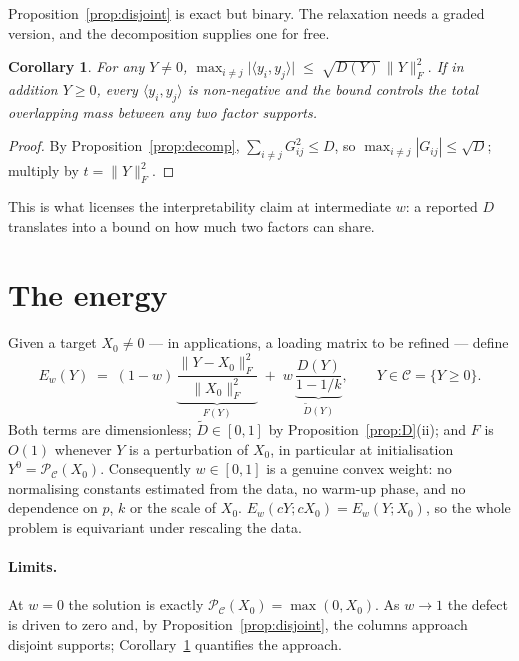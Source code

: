 \documentclass[11pt]{article}
\newtheorem{corollary}[proposition]{Corollary}
\theoremstyle{definition}
\newcommand{\Fnorm}[1]{\lVert #1 \rVert_F}
\newcommand{\ip}[2]{\langle #1, #2 \rangle}
\begin{document}
Proposition~\ref{prop:disjoint} is exact but binary. The relaxation needs a
graded version, and the decomposition supplies one for free.

\begin{corollary}\label{cor:overlap}
For any $Y \ne 0$,
$\displaystyle \max_{i \ne j} \big|\ip{y_i}{y_j}\big| \;\le\; \sqrt{D(Y)}\,\Fnorm{Y}^2 .$
If in addition $Y \ge 0$, every $\ip{y_i}{y_j}$ is non-negative and the bound
controls the total overlapping mass between any two factor supports.
\end{corollary}
\begin{proof}
By Proposition~\ref{prop:decomp}, $\sum_{i\ne j}G_{ij}^2 \le D$, so
$\max_{i\ne j}|G_{ij}| \le \sqrt{D}$; multiply by $t = \Fnorm{Y}^2$.
\end{proof}

This is what licenses the interpretability claim at intermediate $w$: a reported
$D$ translates into a bound on how much two factors can share.

\section{The energy}\label{sec:energy}

Given a target $X_0 \neq 0$ --- in applications, a loading matrix to be refined
--- define
\begin{equation}\label{eq:energy}
  \boxed{\;
  E_w(Y) \;=\; (1-w)\,\underbrace{\frac{\Fnorm{Y-X_0}^2}{\Fnorm{X_0}^2}}_{F(Y)}
          \;+\; w\,\underbrace{\frac{D(Y)}{1-1/k}}_{\tilde D(Y)},
  \qquad Y \in \mathcal{C} = \{Y \ge 0\}. \;}
\end{equation}
Both terms are dimensionless; $\tilde D \in [0,1]$ by
Proposition~\ref{prop:D}(ii); and $F$ is $O(1)$ whenever $Y$ is a perturbation of
$X_0$, in particular at initialisation $Y^0 = \mathcal{P}_\mathcal{C}(X_0)$.
Consequently $w \in [0,1]$ is a genuine convex weight: no normalising constants
estimated from the data, no warm-up phase, and no dependence on $p$, $k$ or the
scale of $X_0$. $E_w(cY; cX_0) = E_w(Y; X_0)$, so the whole problem is
equivariant under rescaling the data.

\paragraph{Limits.} At $w=0$ the solution is exactly
$\mathcal{P}_\mathcal{C}(X_0) = \max(0,X_0)$. As $w \to 1$ the defect is driven to
zero and, by Proposition~\ref{prop:disjoint}, the columns approach disjoint
supports; Corollary~\ref{cor:overlap} quantifies the approach.
\end{document}
